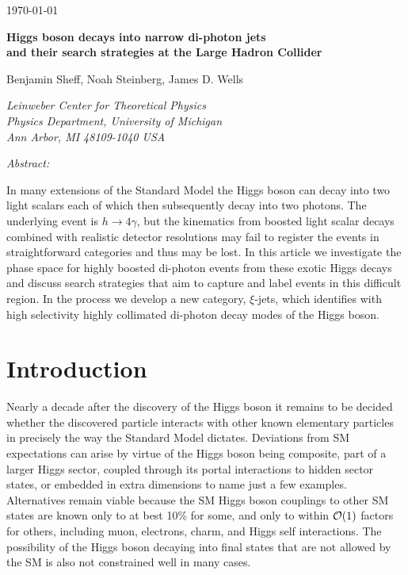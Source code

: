 \documentclass[letter,12pt]{article}
\begin{document}
\begin{flushright}
\today
\end{flushright}

\vspace{0.07in}

\noindent
\begin{center}

{\bf\large Higgs boson decays into narrow di-photon jets \\ and their search strategies at the Large Hadron Collider}


\vspace{0.5cm}
{Benjamin Sheff, Noah Steinberg, James D. Wells}

{\it Leinweber Center for Theoretical Physics \\
Physics Department, University of Michigan \\
Ann Arbor, MI 48109-1040 USA}\\


\end{center}

\noindent
{\it Abstract:} 

In many extensions of the Standard Model the Higgs boson can decay into two light scalars each of which then subsequently decay into two photons. The underlying event is $h\to 4\gamma$, but the kinematics from boosted light scalar decays combined with realistic detector resolutions may fail to register the events in straightforward categories and thus may be lost. In this article we investigate the phase space for highly boosted di-photon events from these exotic Higgs decays and discuss search strategies that aim to capture and label events in this difficult region. In the process we develop a new category, $\xi$-jets,  which identifies with high selectivity highly collimated di-photon decay modes of the Higgs boson.


\vfill\eject

\tableofcontents

\section{Introduction}

Nearly a decade after the discovery of the Higgs boson it remains to be decided whether the discovered particle interacts with other known elementary particles in precisely the way the Standard Model dictates\cite{Sirunyan:2018owy,Aaboud:2018xdt,Belanger:2013xza,Aad:2019mbh,Khachatryan:2016vau,Curtin:2013fra}. Deviations from SM expectations can arise by virtue of the Higgs boson being composite, part of a larger Higgs sector, coupled through its portal interactions to hidden sector states, or embedded in extra dimensions to name just a few examples. Alternatives remain viable because the SM Higgs boson couplings to other SM states are known only to at best 10\% for some, and only to within ${\cal O}(1)$ factors for others, including muon, electrons, charm, and Higgs self interactions\cite{Aad:2020xfq,Aad:2019uzh}. The possibility of the Higgs boson decaying into final states that are not allowed by the SM is also not constrained well in many cases. 
\end{document}
